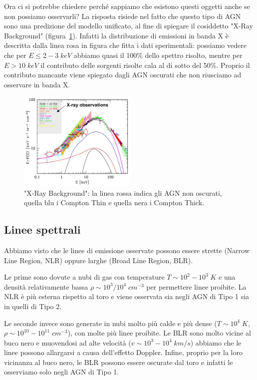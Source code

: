 Ora ci si potrebbe chiedere perché sappiamo che esistono questi oggetti anche se non possiamo osservarli? La risposta risiede nel fatto che questo tipo di AGN sono una predizione del modello unificato, al fine di spiegare il cosiddetto "X-Ray Background" (figura~\ref{fig:xrb-agn}). Infatti la distribuzione di emissioni in banda X è descritta dalla linea rosa in figura che fitta i dati sperimentali: possiamo vedere che per $E \leq 2-3 \;\si{keV}$ abbiamo quasi il 100\% dello spettro risolto, mentre per $E > 10 \;\si{keV}$ il contributo delle sorgenti risolte cala al di sotto del 50\%. Proprio il contributo mancante viene spiegato dagli AGN oscurati che non riusciamo ad osservare in banda X.

\begin{figure}
    \centering
    \includegraphics[width = 0.5\textwidth]{immagini/xrb-agn.png}
    \caption{"X-Ray Background": la linea rossa indica gli AGN non oscurati, quella blu i Compton Thin e quella nera i Compton Thick.}
    \label{fig:xrb-agn}
\end{figure}

\subsection{Linee spettrali}
Abbiamo visto che le linee di emissione osservate possono essere strette (Narrow Line Region, NLR) oppure larghe (Broad Line Region, BLR). 

Le prime sono dovute a nubi di gas con temperature $T \sim 10^2-10^3 \;\si{K}$ e una densità relativamente bassa $\rho \sim 10^3/10^4 \;\si{cm^{-3}}$ per permettere linee proibite. La NLR è più esterna rispetto al toro e viene osservata sia negli AGN di Tipo 1 sia in quelli di Tipo 2. 

Le seconde invece sono generate in nubi molto più calde e più dense ($T\sim 10^4 \;\si{K}$, $\rho \sim 10^{10}-10^{11} \;\si{cm^{-3}}$), con molte più linee proibite. Le BLR sono molto vicine al buco nero e muovendosi ad alte velocità ($v \sim 10^3-10^4 \;\si{km}/\si{s}$) abbiamo che le linee possono allargarsi a causa dell'effetto Doppler. Infine, proprio per la loro vicinanza al buco nero, le BLR possono essere oscurate dal toro e infatti le osserviamo solo negli AGN di Tipo 1.

